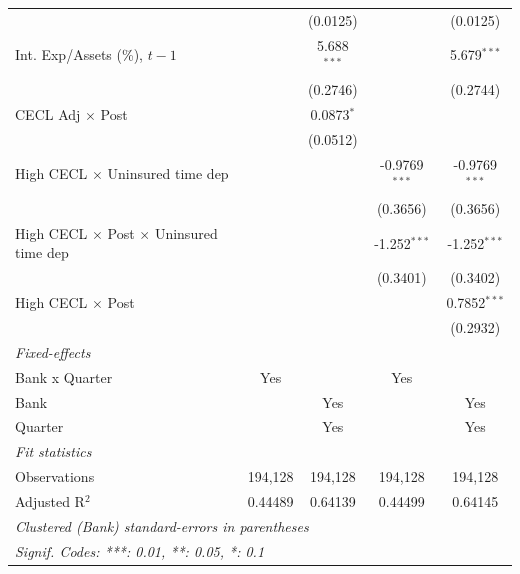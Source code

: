 \begin{tabular}{lcccc}
                                                         &                 & (0.0125)        &                 & (0.0125)\\   
   Int. Exp/Assets (\%), $t{-}1$                         &                 & 5.688$^{***}$   &                 & 5.679$^{***}$\\   
                                                         &                 & (0.2746)        &                 & (0.2744)\\   
   CECL Adj $\times$ Post                                &                 & 0.0873$^{*}$    &                 &   \\   
                                                         &                 & (0.0512)        &                 &   \\   
   High CECL $\times$ Uninsured time dep                 &                 &                 & -0.9769$^{***}$ & -0.9769$^{***}$\\   
                                                         &                 &                 & (0.3656)        & (0.3656)\\   
   High CECL $\times$ Post $\times$ Uninsured time dep   &                 &                 & -1.252$^{***}$  & -1.252$^{***}$\\   
                                                         &                 &                 & (0.3401)        & (0.3402)\\   
   High CECL $\times$ Post                               &                 &                 &                 & 0.7852$^{***}$\\   
                                                         &                 &                 &                 & (0.2932)\\   
   \midrule
   \emph{Fixed-effects}\\
   Bank x Quarter                                        & Yes             &                 & Yes             & \\  
   Bank                                                  &                 & Yes             &                 & Yes\\  
   Quarter                                               &                 & Yes             &                 & Yes\\  
   \midrule
   \emph{Fit statistics}\\
   Observations                                          & 194,128         & 194,128         & 194,128         & 194,128\\  
   Adjusted R$^2$                                        & 0.44489         & 0.64139         & 0.44499         & 0.64145\\  
   \midrule \midrule
   \multicolumn{5}{l}{\emph{Clustered (Bank) standard-errors in parentheses}}\\
   \multicolumn{5}{l}{\emph{Signif. Codes: ***: 0.01, **: 0.05, *: 0.1}}\\
\end{tabular}
 
